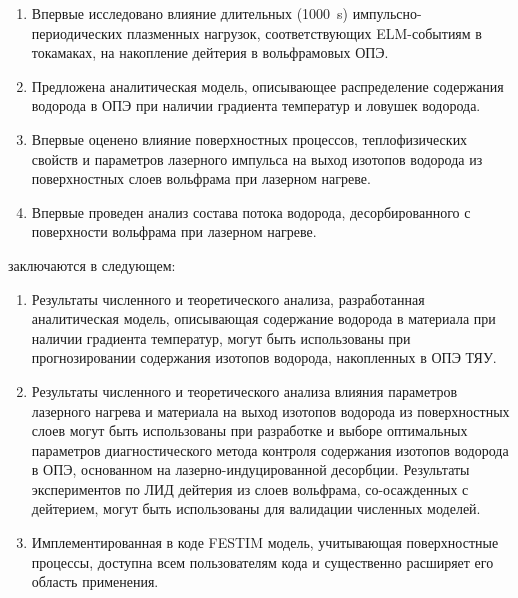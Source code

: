 {\novelty}
\begin{enumerate}[beginpenalty=10000] %
  \item Впервые исследовано влияние длительных (\SI{1000}{\second}) импульсно-периодических плазменных нагрузок, соответствующих ELM-событиям в токамаках, 
  на накопление дейтерия в вольфрамовых ОПЭ.
  \item Предложена  аналитическая модель, описывающее распределение содержания водорода в ОПЭ при наличии градиента температур и ловушек 
  водорода.
  \item Впервые оценено влияние поверхностных процессов, теплофизических свойств и параметров лазерного импульса на выход изотопов водорода из 
  поверхностных слоев вольфрама при лазерном нагреве.
  \item Впервые проведен анализ состава потока водорода, десорбированного с поверхности вольфрама при лазерном нагреве.
\end{enumerate}

{\influence} заключаются в следующем:
\begin{enumerate}[beginpenalty=10000] %
    \item Результаты численного и теоретического анализа, разработанная аналитическая модель, описывающая содержание водорода в материала при наличии
    градиента температур, могут быть использованы при прогнозировании содержания изотопов водорода, накопленных в ОПЭ ТЯУ.
    \item Результаты численного и теоретического анализа влияния параметров лазерного нагрева и материала на выход изотопов водорода из поверхностных 
    слоев могут быть использованы при разработке и выборе оптимальных параметров диагностического метода контроля содержания изотопов водорода в ОПЭ, 
    основанном на лазерно-индуцированной десорбции. Результаты экспериментов по ЛИД дейтерия из слоев вольфрама, со-осажденных с дейтерием, могут
    быть использованы для валидации численных моделей.
    \item Имплементированная в коде FESTIM модель, учитывающая поверхностные процессы, доступна всем пользователям кода и 
    существенно расширяет его область применения. 
  \end{enumerate}


